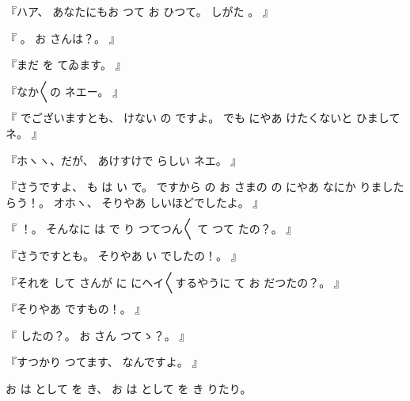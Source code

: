 『ハア、
%
あなたにもお
つて
お
ひつて。
%
しがた
。
』

『
。
%
お
さんは？。
』

『まだ
を
てゐます。
』

『なか〳〵の
ネエー。
』

『
でございますとも、
%
けない
の
ですよ。
%
でも
にやあ
けたくないと
ひましてネ。
』

『ホヽヽ、だが、
%
あけすけで
らしい
ネエ。
』

『さうですよ、
%
も
は
い
で。
%
ですから
の
お
さまの
の
にやあ
なにか
りましたらう！。
%
オホヽ、
%
そりやあ
しいほどでしたよ。
』

『
！。
%
そんなに
は
で
り
つてつん〳〵
て
つて
たの？。
』

『さうですとも。
%
そりやあ
い
でしたの！。
』

『それを
して
さんが
に
にヘイ〳〵するやうに
て
お
だつたの？。
』

『そりやあ
ですもの！。
』

『
したの？。
%
お
さん
つてゝ？。
』

『すつかり
つてます、
%
なんですよ。
』

お
は
として
を
き、
%
お
は
として
を
き
りたり。
